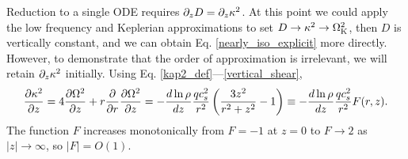 Reduction to a single ODE requires 
$\partial_zD = \partial_z\kappa^2$.  At this point we could apply the 
low frequency and Keplerian approximations to set $D \rightarrow
\kappa^2 \rightarrow \Omega_{\rm K}^2$, then $D$ is vertically constant, 
and we can obtain Eq. \ref{nearly_iso_explicit} more directly.
However, to demonstrate that the order of approximation is irrelevant,
we will retain $\partial_z\kappa^2$ initially. Using 
Eq. \ref{kap2_def}---\ref{vertical_shear},  
\begin{align}\label{dkappa2}
  \frac{\partial \kappa^2}{\partial z} = 4 \frac{\partial\Omega^2}{\partial z} + r\frac{\partial}{\partial
    r}\frac{\partial\Omega^2}{\partial z} = -
  \frac{d\ln\rho}{d z}\frac{qc_s^2}{r^2} \left(
    \frac{3z^2}{r^2+z^2}-1\right) \equiv - \frac{d\ln\rho}{d z}\frac{qc_s^2}{r^2}F(r,z).
\end{align}
The function $F$ increases monotonically from $F=-1$ at $z=0$ to $F\to2$
as $|z|\to\infty $, so $|F|=O(1)$. 



